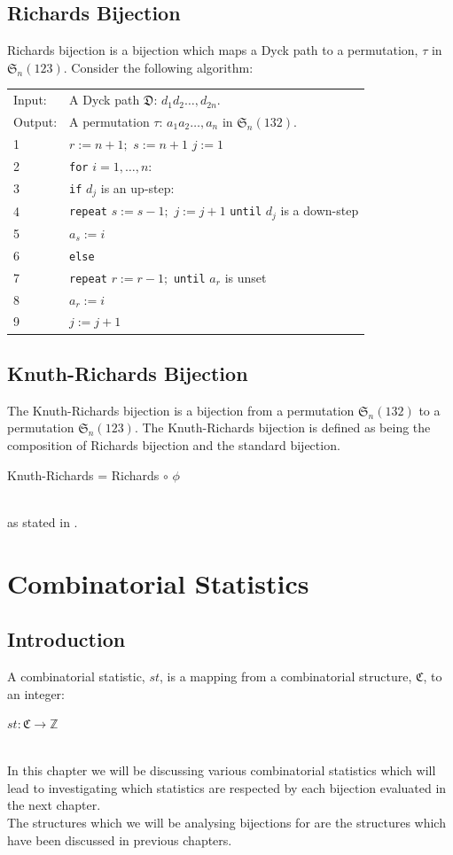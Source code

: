 \documentclass[12pt]{article}
\newcommand{\sym}{\mathfrak{S}}
\newcommand{\DyckP}{\mathfrak{D}}
\begin{document}
\subsection{Richards Bijection}
Richards bijection is a bijection which maps a Dyck path to a permutation, $\tau$ in $\sym_n(123)$.\cite{Clae01}
Consider the following algorithm: \\
\begin{tabular}{ll}
Input:  & A Dyck path $\DyckP$: $d_1d_2\dots,d_{2n}$.\\
Output: & A permutation $\tau$: $a_1a_2\dots,a_n$ in $\sym_n(132)$. \\
1 &\mbox{} $r:=n+1;$ $s:=n+1$ $j:=1$\\
2 &\mbox{} {\tt for} $i=1, \dots, n$: \\
3 &\mbox{} \quad\; {\tt if} $d_j$ is an up-step: \\
4 &\mbox{} \quad\;\quad\; {\tt repeat} $s:=s-1;$ $j:=j+1$ {\tt until} $d_j$ is a down-step \\
5 &\mbox{} \quad\;\quad\; $a_s:=i$ \\
6 &\mbox{} \quad\; {\tt else} \\
7 &\mbox{} \quad\;\quad\; {\tt repeat} $r:=r-1;$ {\tt until} $a_r$ is unset \\
8 &\mbox{} \quad\;\quad\; $a_r:=i$ \\
9 &\mbox{} \quad\; $j:=j+1$
\end{tabular}\bigskip

\subsection{Knuth-Richards Bijection}
\label{KRBijection}
The Knuth-Richards bijection is a bijection from a permutation $\sym_n(132)$ to a permutation $\sym_n(123)$. The Knuth-Richards bijection is defined as being the composition of Richards bijection and the standard bijection.\\
\centerline{Knuth-Richards = Richards $\circ$ $\phi$ }\\
as stated in \cite{Clae01}.

\section{Combinatorial Statistics}
\subsection{Introduction}
A combinatorial statistic, $st$, is a mapping from a combinatorial structure, $\mathfrak{C}$, to an integer:\\
\centerline{$st: \mathfrak{C} \rightarrow \mathbb{Z}$}\\
In this chapter we will be discussing various combinatorial statistics which will lead to investigating which statistics are respected by each bijection evaluated in the next chapter.\\
The structures which we will be analysing bijections for are the structures which have been discussed in previous chapters.
\end{document}
